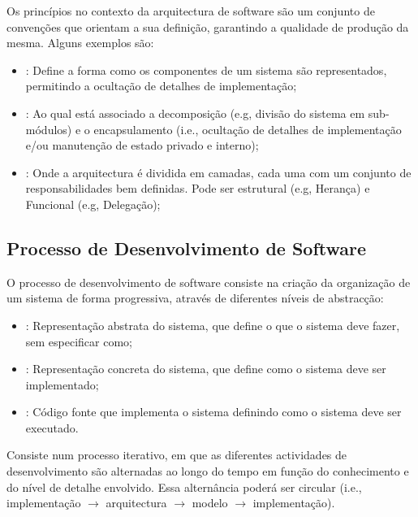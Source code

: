 Os princípios no contexto da arquitectura de software são um conjunto de convenções que orientam a sua definição, garantindo a qualidade de produção da mesma. Alguns exemplos são:
\begin{itemize}[topsep=0pt,itemsep=0pt,partopsep=0pt, parsep=0pt]
    \item {}: Define a forma como os componentes de um sistema são representados, permitindo a ocultação de detalhes de implementação;
    \item {}: Ao qual está associado a decomposição (e.g, divisão do sistema em sub-módulos) e o encapsulamento (i.e., ocultação de detalhes de implementação e/ou manutenção de estado privado e interno);
    \item {}: Onde a arquitectura é dividida em camadas, cada uma com um conjunto de responsabilidades bem definidas. Pode ser estrutural (e.g, Herança) e Funcional (e.g, Delegação);
\end{itemize}
    
\subsection{Processo de Desenvolvimento de Software}\label{subsec:processo-de-desenvolvimento-de-software}

O processo de desenvolvimento de software consiste na
criação da organização de um sistema de forma
progressiva, através de diferentes níveis de abstracção:

\begin{itemize}[topsep=0pt,itemsep=0pt,partopsep=0pt, parsep=0pt]
    \item {}: Representação abstrata do sistema, que define o que o sistema deve fazer, sem especificar como;
    \item {}: Representação concreta do sistema, que define como o sistema deve ser implementado;
    \item {}: Código fonte que implementa o sistema definindo como o sistema deve ser executado.
\end{itemize}

Consiste num processo iterativo, em que as diferentes actividades de desenvolvimento são alternadas ao longo do tempo em função do conhecimento e do nível de detalhe
envolvido. Essa alternância poderá ser circular (i.e., implementação $\rightarrow$ arquitectura $\rightarrow$ modelo $\rightarrow$ implementação).

